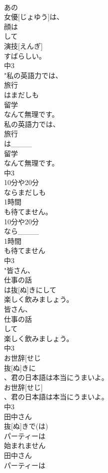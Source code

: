 \documentclass[8pt]{extreport}
\begin{document}
\begin{CJK}{UTF8}{min}
\\	あの
\\	女優[じょゆう]は、
\\	顔は
\\	して
\\	演技[えんぎ]
\\	すばらしい。
\\	中3
\\	"私の英語力では、
\\	旅行
\\	はまだしも
\\	留学
\\	なんて無理です。
\\	私の英語力では、
\\	旅行
\\	は____
\\	留学
\\	なんて無理です。
\\	中3
\\	10分や20分
\\	ならまだしも
\\	1時間
\\	も待てません。
\\	10分や20分
\\	なら____
\\	1時間
\\	も待てません
\\	中3
\\	"皆さん、
\\	仕事の話
\\	は抜[ぬ]きにして
\\	楽しく飲みましょう。
\\	皆さん、
\\	仕事の話
\\	して
\\	楽しく飲みましょう。
\\	中3
\\	お世辞[せじ
\\	抜[ぬ]きに
\\	、君の日本語は本当にうまいよ。
\\	お世辞[せじ]
\\	、君の日本語は本当にうまいよ。
\\	中3
\\	田中さん
\\	抜[ぬ]きで(は)
\\	パーティーは
\\	始まれません
\\	田中さん
\\	パーティーは

\end{CJK}
\end{document}
